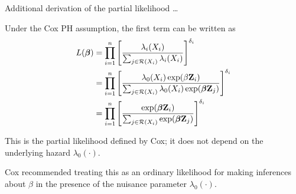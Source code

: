 \documentclass[ignorenonframetext,]{beamer}
\newcommand{\bbeta}{\mbox{\boldmath$\beta$}}
\begin{document}
\begin{frame}{%
\protect\hypertarget{additional-derivation-of-the-partial-likelihood-3}{%
Additional derivation of the partial likelihood \ldots}}

Under the Cox PH assumption, the first term can be written as
\begin{align*}
L(\bbeta) &= \prod_{i=1}^n \left[\frac{\lambda_i(X_i)}{\sum_{j\in
{\cal R}(X_i)}\lambda_i(X_i)}\right]^{\delta_i}\\
&=\prod_{i=1}^n \left[ \frac{\lambda_0(X_i)\exp(\beta {\bf Z}_i)}
{\sum_{j\in {\cal R}(X_i)}
\lambda_0(X_i)\exp(\bbeta {\bf Z}_j)}\right]^{\delta_i}\\
&=\prod_{i=1}^n \left[ \frac{\exp(\bbeta {\bf Z}_i)}
{\sum_{j\in {\cal R}(X_i)}\exp(\bbeta {\bf Z}_j)}\right]^{\delta_i}
\end{align*}

This is the partial likelihood defined by Cox; it does not depend on the
underlying hazard \(\lambda_0(\cdot)\).

Cox recommended treating this as an ordinary likelihood for making
inferences about \(\beta\) in the presence of the nuisance parameter
\(\lambda_0(\cdot)\).

\end{frame}
\end{document}
